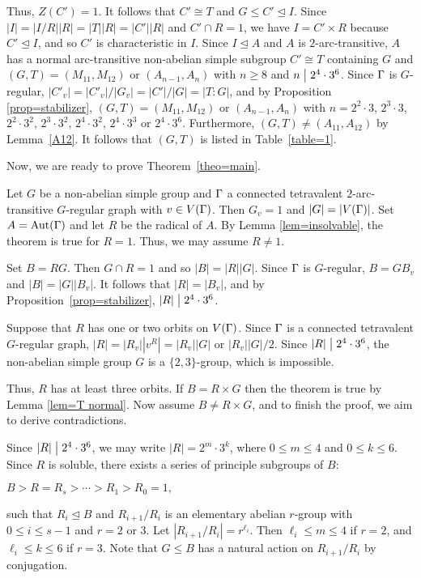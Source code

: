 \documentclass[12pt]{article}
\def\di{\bigm|} \def\lg{\langle} \def\rg{\rangle}
\def\f{\noindent}
\def\Aut{\hbox{\rm Aut}}
\newcommand{\qed}{\mbox{\raisebox{0.7ex}{\fbox{}}} \vspace{4truemm}}
\begin{document}
Thus, $Z(C')=1$. It follows that $C'\cong T$ and $G\leq  C'\unlhd I$. Since $|I|=|I/R||R|=|T||R|=|C'||R|$ and $C'\cap R=1$, we have $I=C'\times R$ because $C'\unlhd I$, and so $C'$ is characteristic in $I$. Since $I\unlhd A$ and $A$ is $2$-arc-transitive, $A$ has a normal arc-transitive non-abelian simple subgroup $C'\cong T$ containing $G$ and $(G,T)=(M_{11},M_{12})$ or $(A_{n-1},A_n)$ with $n\geq 8$ and $n\di 2^4\cdot 3^6$. Since $\Gamma$ is $G$-regular, $|C'_v|=|C'_v|/|G_v|=|C'|/|G|=|T:G|$, and by Proposition \ref{prop=stabilizer}, $(G,T)=(M_{11},M_{12})$ or $(A_{n-1},A_n)$ with $n=2^2\cdot 3$, $2^3\cdot 3$, $2^2\cdot3^2$, $2^3\cdot3^2$, $2^4\cdot3^2$, $2^4\cdot3^3$ or $2^4\cdot3^6$. Furthermore, $(G,T)\not=(A_{11},A_{12})$ by Lemma~\ref{A12}. It follows that $(G,T)$ is listed in Table~\ref{table=1}.
\hfill\qed


Now, we are ready to prove Theorem~\ref{theo=main}.

\medskip

\f {\bf The proof of Theorem \ref{theo=main}:} Let $G$ be a non-abelian simple group and $\Gamma$ a connected tetravalent $2$-arc-transitive $G$-regular graph with   $v\in V(\Gamma)$. Then $G_v=1$ and $|G|=|V(\Gamma)|$. Set $A=\Aut(\G)$ and let $R$ be the radical of $A$. By Lemma \ref{lem=insolvable}, the theorem is true for $R=1$. Thus, we may assume $R\not=1$.

Set $B=RG$. Then $G\cap R=1$ and so $|B|=|R||G|$. Since $\Gamma$ is $G$-regular,  $B=GB_v$ and $|B|=|G||B_v|$. It follows that $|R|=|B_v|$, and by Proposition~\ref{prop=stabilizer}, $|R|\di 2^4\cdot 3^6$.

Suppose that $R$ has one or two orbits on $V(\Gamma)$. Since $\Gamma$ is a connected tetravalent $G$-regular graph, $|R|=|R_v||v^R|=|R_v||G|$ or $|R_v||G|/2$. Since $|R|\di 2^4 \cdot 3^6$, the non-abelian simple group $G$ is a $\{2,3\}$-group,  which is impossible.

Thus, $R$ has at least three orbits. If $B=R\times G$ then the theorem is true by Lemma \ref{lem=T normal}. Now assume $B\not=R\times G$, and to finish the proof, we aim to derive contradictions.

Since $|R|\di 2^4\cdot 3^6$, we may write $|R|=2^m\cdot3^k$, where $0\leq m\leq 4$ and
$0\leq k\leq 6$. Since $R$ is soluble, there exists a series of principle subgroups of $B$:
\begin{center}
$B>R=R_{s}>\cdots >R_1>R_0=1,$
\end{center}
such that $R_i\unlhd B$ and $R_{i+1}/R_i$ is an elementary abelian $r$-group with $0\leq i\leq s-1$ and $r=2$ or $3$. Let $|R_{i+1}/R_i|=r^{\ell_i}$. Then $\ell_i\leq m\leq 4$ if $r=2$, and $\ell_i\leq k\leq 6$ if $r=3$. Note that $G\leq B$ has a natural action on $R_{i+1}/R_i$ by conjugation.
\end{document}
